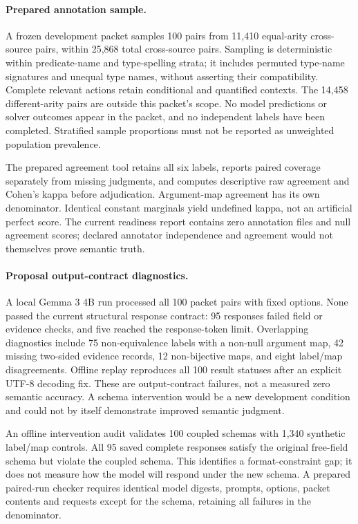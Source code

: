 \documentclass[letterpaper]{article}
\begin{document}
\paragraph{Prepared annotation sample.}
A frozen development packet samples 100 pairs from 11,410 equal-arity cross-source pairs, within 25,868 total cross-source pairs. Sampling is deterministic within predicate-name and type-spelling strata; it includes permuted type-name signatures and unequal type names, without asserting their compatibility. Complete relevant actions retain conditional and quantified contexts. The 14,458 different-arity pairs are outside this packet's scope. No model predictions or solver outcomes appear in the packet, and no independent labels have been completed. Stratified sample proportions must not be reported as unweighted population prevalence.

The prepared agreement tool retains all six labels, reports paired coverage separately from missing judgments, and computes descriptive raw agreement and Cohen's kappa before adjudication. Argument-map agreement has its own denominator. Identical constant marginals yield undefined kappa, not an artificial perfect score. The current readiness report contains zero annotation files and null agreement scores; declared annotator independence and agreement would not themselves prove semantic truth.

\paragraph{Proposal output-contract diagnostics.}
A local Gemma 3 4B run processed all 100 packet pairs with fixed options. None passed the current structural response contract: 95 responses failed field or evidence checks, and five reached the response-token limit. Overlapping diagnostics include 75 non-equivalence labels with a non-null argument map, 42 missing two-sided evidence records, 12 non-bijective maps, and eight label/map disagreements. Offline replay reproduces all 100 result statuses after an explicit UTF-8 decoding fix. These are output-contract failures, not a measured zero semantic accuracy. A schema intervention would be a new development condition and could not by itself demonstrate improved semantic judgment.

An offline intervention audit validates 100 coupled schemas with 1,340 synthetic label/map controls. All 95 saved complete responses satisfy the original free-field schema but violate the coupled schema. This identifies a format-constraint gap; it does not measure how the model will respond under the new schema. A prepared paired-run checker requires identical model digests, prompts, options, packet contents and requests except for the schema, retaining all failures in the denominator.
\end{document}
